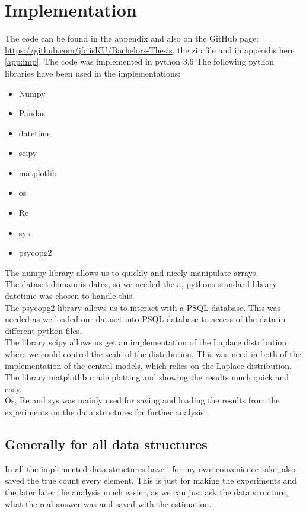 \documentclass[11pt]{article}
\theoremstyle{definition}
\begin{document}
\section{Implementation}
The code can be found in the appendix and also on the GitHub page: \url{https://github.com/jfriisKU/Bachelors-Thesis}, the zip file and in appendis here \ref{app:imp}. The code was implemented in python 3.6
The following python libraries have been used in the implementations: 
\begin{multicols}{2}
\begin{itemize}
    \item Numpy
    \item Pandas
    \item datetime
    \item scipy
    \item matplotlib
    \item os
    \item Re
    \item sys
    \item psycopg2
\end{itemize}
\end{multicols}

The numpy library allows us to quickly and nicely manipulate arrays. \\ The dataset domain is dates, so we needed the a, pythons standard library datetime was chosen to handle this. \\ The psycopg2 library allows us to interact with a PSQL database. This was needed as we loaded our dataset into PSQL database to access of the data in different python files. \\ 
The library scipy allows us get an implementation of the Laplace distribution where we could control the scale of the distribution. This was need in both of the implementation of the central models, which relies on the Laplace distribution. \\
The library matplotlib made plotting and showing the results much quick and easy. \\
Os, Re and sys was mainly used for saving and loading the results from the experiments on the data structures for further analysis.

\subsection{Generally for all data structures}
In all the implemented data structures have i for my own convenience sake, also saved the true count every element. This is just for making the experiments and the later later the analysis much easier, as we can just ask the data structure, what the real answer was and saved with the estimation. 
\end{document}
